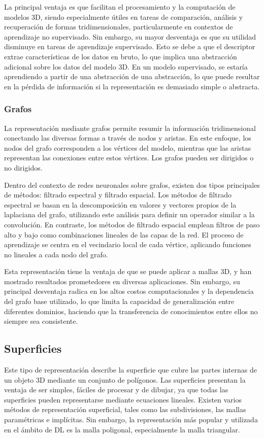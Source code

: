 La principal ventaja es que facilitan el procesamiento y la computación de modelos 3D, siendo especialmente útiles en tareas de comparación, análisis y recuperación de formas tridimensionales, particularmente en contextos de aprendizaje no supervisado. Sin embargo, su mayor desventaja es que su utilidad disminuye en tareas de aprendizaje supervisado. Esto se debe a que el descriptor extrae características de los datos en bruto, lo que implica una abstracción adicional sobre los datos del modelo 3D. En un modelo supervisado, se estaría aprendiendo a partir de una abstracción de una abstracción, lo que puede resultar en la pérdida de información si la representación es demasiado simple o abstracta.

\subsubsection{Grafos}
La representación mediante grafos permite resumir la información tridimensional conectando las diversas formas a través de nodos y aristas. En este enfoque, los nodos del grafo corresponden a los vértices del modelo, mientras que las aristas representan las conexiones entre estos vértices. Los grafos pueden ser dirigidos o no dirigidos.

Dentro del contexto de redes neuronales sobre grafos, existen dos tipos principales de métodos: filtrado espectral y filtrado espacial. Los métodos de filtrado espectral se basan en la descomposición en valores y vectores propios de la laplaciana del grafo, utilizando este análisis para definir un operador similar a la convolución. En contraste, los métodos de filtrado espacial emplean filtros de paso alto y bajo como combinaciones lineales de las capas de la red. El proceso de aprendizaje se centra en el vecindario local de cada vértice, aplicando funciones no lineales a cada nodo del grafo.

Esta representación tiene la ventaja de que se puede aplicar a mallas 3D, y han mostrado resultados prometedores en diversas aplicaciones. Sin embargo, su principal desventaja radica en los altos costos computacionales y la dependencia del grafo base utilizado, lo que limita la capacidad de generalización entre diferentes dominios, haciendo que la transferencia de conocimientos entre ellos no siempre sea consistente.

\subsection{Superficies}
Este tipo de representación describe la superficie que cubre las partes internas de un objeto 3D mediante un conjunto de polígonos. Las superficies presentan la ventaja de ser simples, fáciles de procesar y de dibujar, ya que todas las superficies pueden representarse mediante ecuaciones lineales. Existen varios métodos de representación superficial, tales como las subdivisiones, las mallas paramétricas e implícitas. Sin embargo, la representación más popular y utilizada en el ámbito de DL es la malla poligonal, especialmente la malla triangular.

